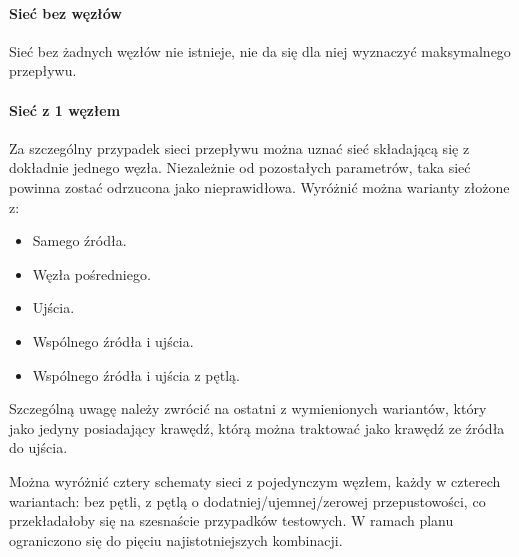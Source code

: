 \begin{itemize}[nosep]
\begin{itemize}[nosep]
\begin{itemize}[nosep]
\paragraph{Sieć bez węzłów}
Sieć bez żadnych węzłów nie istnieje, nie da się dla niej wyznaczyć maksymalnego
przepływu.

\paragraph{Sieć z 1 węzłem}
Za szczególny przypadek sieci przepływu można uznać sieć składającą się z
dokładnie jednego węzła. Niezależnie od pozostałych parametrów, taka sieć
powinna zostać odrzucona jako nieprawidłowa. Wyróżnić można warianty złożone z:
\begin{itemize}[nosep]
    \item Samego źródła.
    \item Węzła pośredniego.
    \item Ujścia.
    \item Wspólnego źródła i ujścia.
    \item Wspólnego źródła i ujścia z pętlą.
\end{itemize}
Szczególną uwagę należy zwrócić na ostatni z wymienionych wariantów, który jako
jedyny posiadający krawędź, którą można traktować jako krawędź ze źródła do
ujścia.

Można wyróżnić cztery schematy sieci z pojedynczym węzłem, każdy w czterech
wariantach: bez pętli, z pętlą o dodatniej/ujemnej/zerowej przepustowości, co
przekładałoby się na szesnaście przypadków testowych. W ramach planu ograniczono
się do pięciu najistotniejszych kombinacji.


\end{itemize}
\end{itemize}
\end{itemize}
